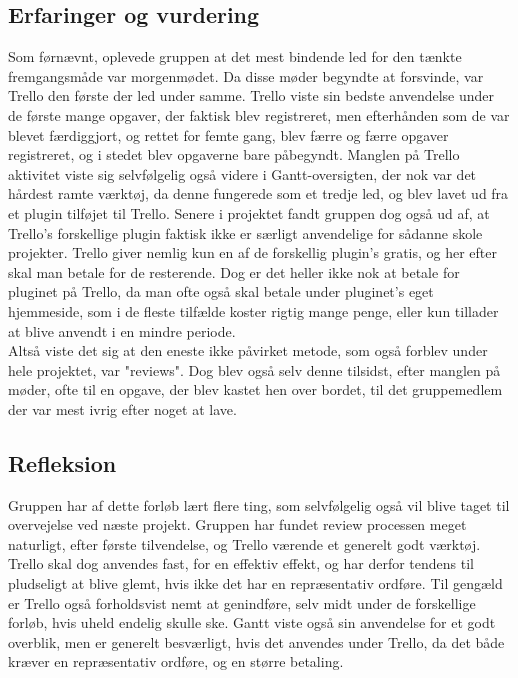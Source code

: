\documentclass[11pt]{article}
\begin{document}
\subsection{Erfaringer og vurdering}
Som førnævnt, oplevede gruppen at det mest bindende led for den tænkte fremgangsmåde var morgenmødet. Da disse møder begyndte at forsvinde, var Trello den første der led under samme. Trello viste sin bedste anvendelse under de første mange opgaver, der faktisk blev registreret, men efterhånden som de var blevet færdiggjort, og rettet for femte gang, blev færre og færre opgaver registreret, og i stedet blev opgaverne bare påbegyndt. Manglen på Trello aktivitet viste sig selvfølgelig også videre i Gantt-oversigten, der nok var det hårdest ramte værktøj, da denne fungerede som et tredje led, og blev lavet ud fra et plugin tilføjet til Trello. Senere i projektet fandt gruppen dog også ud af, at Trello's forskellige plugin faktisk ikke er særligt anvendelige for sådanne skole projekter. Trello giver nemlig kun en af de forskellig plugin's gratis, og her efter skal man betale for de resterende. Dog er det heller ikke nok at betale for pluginet på Trello, da man ofte også skal betale under pluginet's eget hjemmeside, som i de fleste tilfælde koster rigtig mange penge, eller kun tillader at blive anvendt i en mindre periode.\\
Altså viste det sig at den eneste ikke påvirket metode, som også forblev under hele projektet, var "reviews". Dog blev også selv denne tilsidst, efter manglen på møder, ofte til en opgave, der blev kastet hen over bordet, til det gruppemedlem der var mest ivrig efter noget at lave.

\subsection{Refleksion}
Gruppen har af dette forløb lært flere ting, som selvfølgelig også vil blive taget til overvejelse ved næste projekt. Gruppen har fundet review processen meget naturligt, efter første tilvendelse, og Trello værende et generelt godt værktøj. Trello skal dog anvendes fast, for en effektiv effekt, og har derfor tendens til pludseligt at blive glemt, hvis ikke det har en repræsentativ ordføre. Til gengæld er Trello også forholdsvist nemt at genindføre, selv midt under de forskellige forløb, hvis uheld endelig skulle ske. Gantt viste også sin anvendelse for et godt overblik, men er generelt besværligt, hvis det anvendes under Trello, da det både kræver en repræsentativ ordføre, og en større betaling.
\end{document}
